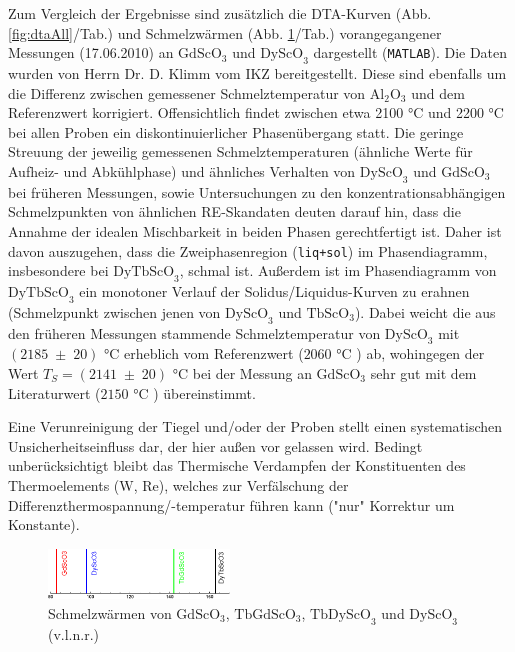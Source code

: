 \documentclass[aps,twocolumn,secnumarabic,nobalancelastpage,amsmath,amssymb,
nofootinbib,superscriptaddress]{revtex4-1}
\begin{document}
\noindent Zum Vergleich der Ergebnisse sind zusätzlich die DTA-Kurven (Abb. \ref{fig:dtaAll}/Tab.) und Schmelzwärmen (Abb. \ref{fig:QAll}/Tab.) vorangegangener Messungen (17.06.2010) an $\text{GdScO}_3$ und $\text{DyScO}_3$ dargestellt (\texttt{MATLAB}).
Die Daten wurden von Herrn Dr. D. Klimm vom IKZ bereitgestellt. Diese sind ebenfalls um die Differenz zwischen gemessener Schmelztemperatur von $\text{Al}_{2}\text{O}_3$ und dem Referenzwert
korrigiert.
\noindent Offensichtlich findet zwischen etwa 2100 °C und 2200 °C bei allen Proben ein diskontinuierlicher Phasenübergang statt. Die geringe
Streuung der jeweilig gemessenen Schmelztemperaturen (ähnliche Werte für Aufheiz- und Abkühlphase) und ähnliches Verhalten von $\text{DyScO}_3$ und $\text{GdScO}_3$
bei früheren Messungen, sowie Untersuchungen zu den konzentrationsabhängigen Schmelzpunkten von ähnlichen RE-Skandaten deuten darauf hin, dass die Annahme der idealen Mischbarkeit in
beiden Phasen gerechtfertigt ist. Daher ist davon auszugehen, dass die Zweiphasenregion (\texttt{liq+sol}) im Phasendiagramm, insbesondere bei $\text{DyTbScO}_3$, schmal ist.
Außerdem ist im Phasendiagramm von $\text{DyTbScO}_3$ ein monotoner Verlauf der Solidus/Liquidus-Kurven zu erahnen (Schmelzpunkt zwischen jenen von $\text{DyScO}_3$ und $\text{TbScO}_3$).
Dabei weicht die aus den früheren Messungen stammende Schmelztemperatur von $\text{DyScO}_3$ mit $(2185\;\pm\;20)\text{ °C}$ erheblich vom Referenzwert ($2060\text{ °C}$ \cite{meltpDyScO3}) ab,
wohingegen der Wert $T_S=(2141\;\pm\; 20)\text{ °C}$ bei der Messung an $\text{GdScO}_3$ sehr gut mit dem Literaturwert ($2150\text{ °C}$ \cite{paperK}) übereinstimmt.

Eine Verunreinigung der Tiegel und/oder der Proben stellt einen systematischen Unsicherheitseinfluss dar, der hier außen vor gelassen wird. Bedingt unberücksichtigt bleibt das Thermische Verdampfen
der Konstituenten des Thermoelements (W, Re), welches zur Verfälschung der Differenzthermospannung/-temperatur führen kann ("nur"  Korrektur um Konstante).

\begin{figure}[t]
  \centering
  \includegraphics[width=0.43\textwidth]{../img/plotSchmelzwaermen.eps}
  \caption{\label{fig:QAll} Schmelzwärmen von $\text{GdScO}_3$, $\text{TbGdScO}_3$, $\text{TbDyScO}_3$ und $\text{DyScO}_3$ (v.l.n.r.) }
\end{figure}
\end{document}
